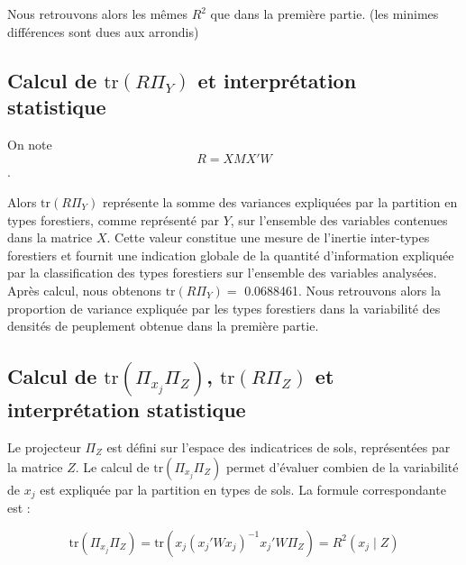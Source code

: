 \documentclass[
]{article}
\begin{document}
Nous retrouvons alors les mêmes \(R^2\) que dans la première partie.
(les minimes différences sont dues aux arrondis)

\hypertarget{calcul-de-texttrr-pi_y-et-interpruxe9tation-statistique}{%
\subsection{\texorpdfstring{Calcul de \(\text{tr}(R \Pi_Y)\) et
interprétation
statistique}{Calcul de \textbackslash text\{tr\}(R \textbackslash Pi\_Y) et interprétation statistique}}\label{calcul-de-texttrr-pi_y-et-interpruxe9tation-statistique}}

On note \[ R = X M X' W \].

Alors \(\text{tr}(R \Pi_Y)\) représente la somme des variances
expliquées par la partition en types forestiers, comme représenté par
\(Y\), sur l'ensemble des variables contenues dans la matrice \(X\).
Cette valeur constitue une mesure de l'inertie inter-types forestiers et
fournit une indication globale de la quantité d'information expliquée
par la classification des types forestiers sur l'ensemble des variables
analysées. Après calcul, nous obtenons \(\text{tr}(R \Pi_Y) =\)
0.0688461. Nous retrouvons alors la proportion de variance expliquée par
les types forestiers dans la variabilité des densités de peuplement
obtenue dans la première partie.

\hypertarget{calcul-de-texttrpi_x_j-pi_z-texttrr-pi_z-et-interpruxe9tation-statistique}{%
\subsection{\texorpdfstring{Calcul de \(\text{tr}(\Pi_{x_j} \Pi_Z)\),
\(\text{tr}(R \Pi_Z)\) et interprétation
statistique}{Calcul de \textbackslash text\{tr\}(\textbackslash Pi\_\{x\_j\} \textbackslash Pi\_Z), \textbackslash text\{tr\}(R \textbackslash Pi\_Z) et interprétation statistique}}\label{calcul-de-texttrpi_x_j-pi_z-texttrr-pi_z-et-interpruxe9tation-statistique}}

Le projecteur \(\Pi_Z\) est défini sur l'espace des indicatrices de
sols, représentées par la matrice \(Z\). Le calcul de
\(\text{tr}(\Pi_{x_j} \Pi_Z)\) permet d'évaluer combien de la
variabilité de \(x_j\) est expliquée par la partition en types de sols.
La formule correspondante est :

\[
\text{tr}(\Pi_{x_j} \Pi_Z) = \text{tr} ({x_j} \left( {x_j}' W {x_j} \right)^{-1} {x_j}' W \Pi_Z) = R^2({x_j} \mid Z)
\]
\end{document}
